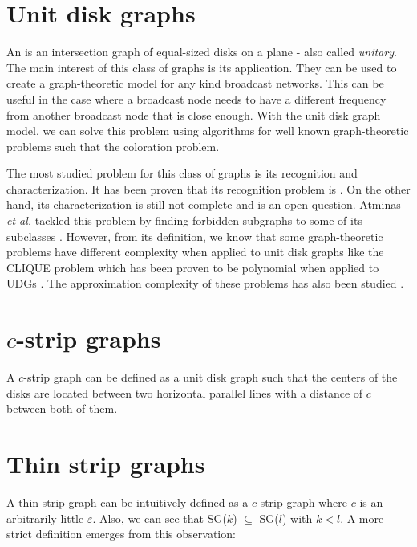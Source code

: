 \section{Unit disk graphs}

An \emph{} is an intersection graph of equal-sized disks on a plane - also called \emph{unitary}. The main interest of this class of graphs is its application. They can be used to create a graph-theoretic model for any kind broadcast networks. This can be useful in the case where a broadcast node needs to have a different frequency from another broadcast node that is close enough. With the unit disk graph model, we can solve this problem using algorithms for well known graph-theoretic problems such that the coloration problem.

The most studied problem for this class of graphs is its recognition and characterization. It has been proven that its recognition problem is  \cite{Schaefer2013}. On the other hand, its characterization is still not complete and is an open question. Atminas \textit{et al.} tackled this problem by finding forbidden subgraphs to some of its subclasses \cite{atminasForbiddenInducedSubgraphs2016}. However, from its definition, we know that some graph-theoretic problems have different complexity when applied to unit disk graphs like the CLIQUE problem which has been proven to be polynomial when applied to UDGs \cite{CLARK1990165}. The approximation complexity of these problems has also been studied \cite{DBLP:journals/corr/abs-1712-05010}.

\section{$c$-strip graphs}

A $c$-strip graph can be defined as a unit disk graph such that the centers of the disks are located between two horizontal parallel lines with a distance of $c$ between both of them.


\section{Thin strip graphs}

A thin strip graph can be intuitively defined as a $c$-strip graph where $c$ is an arbitrarily little $\varepsilon$. Also, we can see that SG($k$) $\subseteq$ SG($l$) with $k<l$. A more strict definition emerges from this observation:

